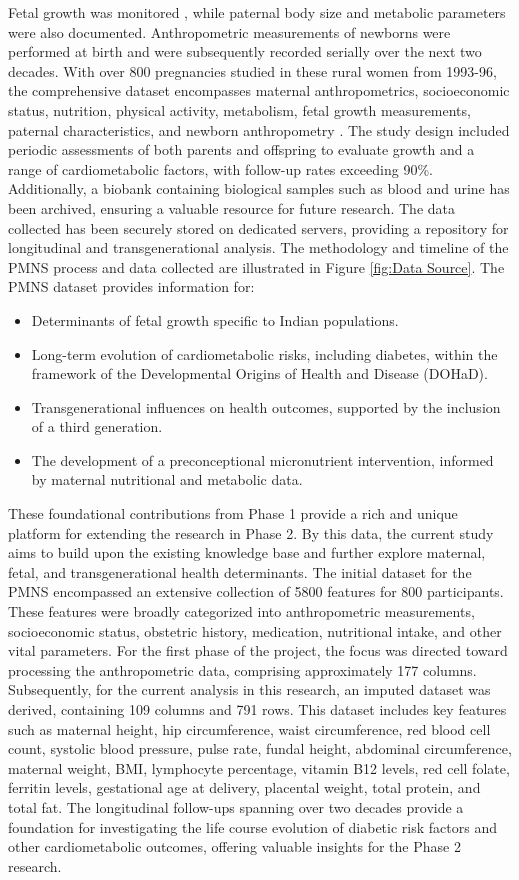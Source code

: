 \documentclass[12pt]{article}
\begin{document}
Fetal growth was monitored , while paternal body size and metabolic parameters were also documented. Anthropometric measurements of newborns were performed at birth and were subsequently recorded serially over the next two decades. With over 800 pregnancies studied in these rural women from 1993-96, the comprehensive dataset encompasses maternal anthropometrics, socioeconomic status, nutrition, physical activity, metabolism, fetal growth measurements, paternal characteristics, and newborn anthropometry \cite{12A}. The study design included periodic assessments of both parents and offspring to evaluate growth and a range of cardiometabolic factors, with follow-up rates exceeding 90\%. Additionally, a biobank containing biological samples such as blood and urine has been archived, ensuring a valuable resource for future research. The data collected has been securely stored on dedicated servers, providing a repository for longitudinal and transgenerational analysis. The methodology and timeline of the PMNS process and data collected  are illustrated in Figure \ref{fig:Data Source}.
The PMNS dataset provides information for: 
\begin{itemize}
    \item Determinants of fetal growth specific to Indian populations.
    \item Long-term evolution of cardiometabolic risks, including diabetes, within the framework of the Developmental Origins of Health and Disease (DOHaD).
    \item Transgenerational influences on health outcomes, supported by the inclusion of a third generation.
    \item The development of a preconceptional micronutrient intervention, informed by maternal nutritional and metabolic data.
\end{itemize}
These foundational contributions from Phase 1 \cite{8A} provide a rich and unique platform for extending the research in Phase 2. By this data, the current study aims to build upon the existing knowledge base and further explore maternal, fetal, and transgenerational health determinants. The initial dataset for the PMNS encompassed an extensive collection of 5800 features for 800 participants. These features were broadly categorized into anthropometric measurements, socioeconomic status, obstetric history, medication, nutritional intake, and other vital parameters. For the first phase of the project, the focus was directed toward processing the anthropometric data, comprising approximately 177 columns. Subsequently, for the current analysis in this research, an imputed dataset was derived, containing 109 columns and 791 rows. This dataset includes key features such as maternal height, hip circumference, waist circumference, red blood cell count, systolic blood pressure, pulse rate, fundal height, abdominal circumference, maternal weight, BMI, lymphocyte percentage, vitamin B12 levels, red cell folate, ferritin levels, gestational age at delivery, placental weight, total protein, and total fat. The longitudinal follow-ups spanning over two decades provide a foundation for investigating the life course evolution of diabetic risk factors and other cardiometabolic outcomes, offering valuable insights for the Phase 2 research.
\end{document}
